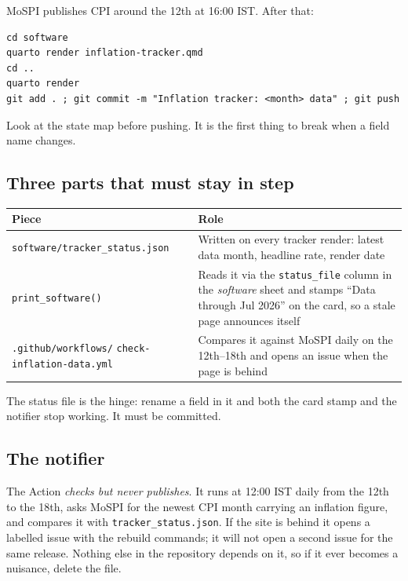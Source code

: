 \documentclass[11pt,a4paper]{article}
\newcommand{\file}[1]{\texttt{#1}}
\begin{document}
MoSPI publishes CPI around the 12th at 16:00 IST. After that:

\begin{lstlisting}
cd software
quarto render inflation-tracker.qmd
cd ..
quarto render
git add . ; git commit -m "Inflation tracker: <month> data" ; git push
\end{lstlisting}

Look at the state map before pushing. It is the first thing to break when
a field name changes.

\subsection{Three parts that must stay in step}

\begin{center}
\begin{tabular}{@{}lp{8.2cm}@{}}
\toprule
\textbf{Piece} & \textbf{Role} \\
\midrule
\file{software/tracker\_status.json} & Written on every tracker render:
  latest data month, headline rate, render date \\
\texttt{print\_software()} & Reads it via the \texttt{status\_file} column
  in the \emph{software} sheet and stamps ``Data through Jul 2026'' on the
  card, so a stale page announces itself \\
\file{.github/workflows/} \file{check-inflation-data.yml} & Compares it
  against MoSPI daily on the 12th--18th and opens an issue when the page
  is behind \\
\bottomrule
\end{tabular}
\end{center}

The status file is the hinge: rename a field in it and both the card stamp
and the notifier stop working. It must be committed.

\subsection{The notifier}

The Action \emph{checks but never publishes}. It runs at 12:00 IST daily
from the 12th to the 18th, asks MoSPI for the newest CPI month carrying an
inflation figure, and compares it with \file{tracker\_status.json}. If the
site is behind it opens a labelled issue with the rebuild commands; it will
not open a second issue for the same release. Nothing else in the repository
depends on it, so if it ever becomes a nuisance, delete the file.
\end{document}
